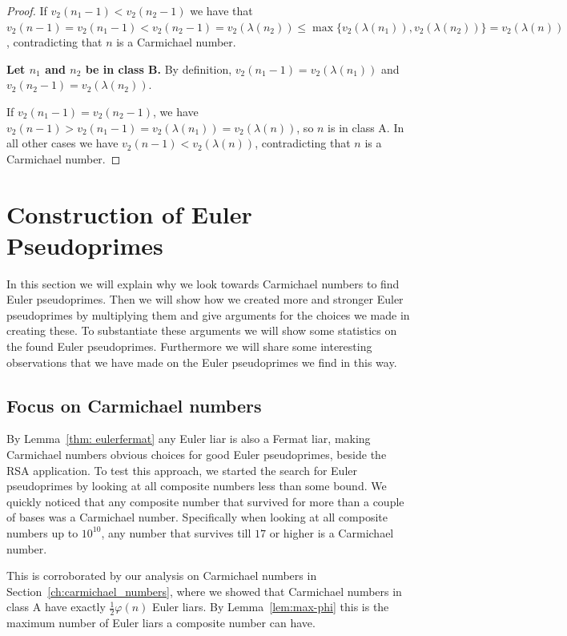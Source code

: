 \documentclass[runningheads]{amsart}
\begin{document}
\begin{proof}
If
$v_2(n_1
- 1)
<
v_2(n_2-1)$
we have that
$v_2(n-1)=v_2(n_1-1)
<
v_2(n_2-1)
=
v_2(\lambda(n_2))
\le \max\{v_2(\lambda(n_1)), v_2(\lambda(n_2))\} = v_2(\lambda(n))$, contradicting that
$n$ is a Carmichael number.

{\bf
 Let
$n_1$
and
$n_2$
be in class
B.}
By definition,
$v_2(n_1-1)
=
v_2(\lambda(n_1))$
and
$v_2(n_2-1)
=
v_2(\lambda(n_2))$.

If
$v_2(n_1
- 1) =
v_2(n_2-1)$,
we have
$v_2(n-1)
>
v_2(n_1-1)
=
v_2(\lambda(n_1))
=
v_2(\lambda(n))$,
so $n$ is in class A.
In all other cases we have
$v_2(n
-1)
<
v_2(\lambda(n))$,
contradicting that $n$ is a Carmichael number.
\end{proof}

\section{Construction of Euler Pseudoprimes}\label{sec:construct_carmichael}
In this section we will explain why we look towards Carmichael numbers to find Euler
pseudoprimes.
Then we will show how we created more and stronger Euler pseudoprimes by multiplying
them and give arguments for the choices we made in creating these.
To substantiate these arguments we will show some statistics on the found Euler pseudoprimes.
Furthermore we will share some interesting observations that we have made on the Euler
pseudoprimes we find in this way.

\subsection{Focus on Carmichael numbers}
By
Lemma~\ref{thm:
eulerfermat}
any Euler liar is also a Fermat liar,
making Carmichael numbers obvious choices for good Euler pseudoprimes,
beside the RSA application.
To test this approach,
we started the search for Euler pseudoprimes by looking at all composite numbers less
than some bound.
We quickly noticed that any composite number that survived for more than a couple
of bases was a Carmichael number.
Specifically when looking at all composite numbers up to
$10^{10}$,
any number that survives till $17$ or higher is a Carmichael number.

This is corroborated by our analysis on Carmichael numbers in
Section~\ref{ch:carmichael_numbers},
where we showed that Carmichael numbers in class A have exactly
$\frac{1}{2}\varphi(n)$
Euler liars.
By
Lemma~\ref{lem:max-phi}
this is the maximum number of Euler liars a composite number can have.
\end{document}
